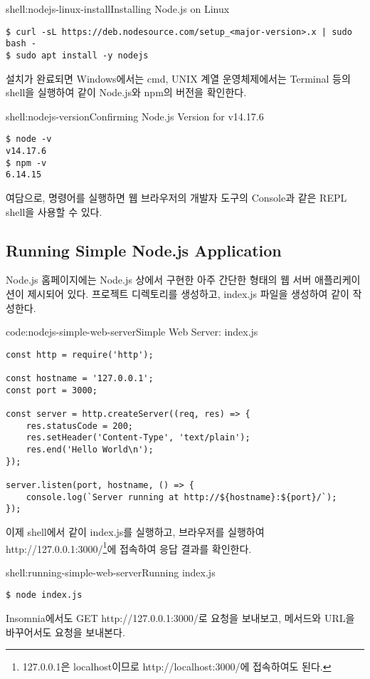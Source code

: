 \begin{shellenv}{shell:nodejs-linux-install}{Installing Node.js on Linux}\begin{verbatim}
$ curl -sL https://deb.nodesource.com/setup_<major-version>.x | sudo bash -
$ sudo apt install -y nodejs
\end{verbatim}
\end{shellenv}

설치가 완료되면 Windows에서는 cmd, UNIX 계열 운영체제에서는 Terminal 등의 shell을 실행하여 \과 같이 Node.js와 npm의 버전을 확인한다.

\begin{shellenv}{shell:nodejs-version}{Confirming Node.js Version for v14.17.6}\begin{verbatim}
$ node -v
v14.17.6
$ npm -v
6.14.15
\end{verbatim}
\end{shellenv}

여담으로,  명령어를 실행하면 웹 브라우저의 개발자 도구의 Console과 같은 REPL shell을 사용할 수 있다.

\subsection*{Running Simple Node.js Application}

Node.js 홈페이지에는 Node.js 상에서 구현한 아주 간단한 형태의 웹 서버 애플리케이션이 제시되어 있다. 프로젝트 디렉토리를 생성하고, index.js 파일을 생성하여 \와 같이 작성한다.

\begin{codeenv}{code:nodejs-simple-web-server}{Simple Web Server: index.js}\begin{verbatim}
const http = require('http');

const hostname = '127.0.0.1';
const port = 3000;

const server = http.createServer((req, res) => {
    res.statusCode = 200;
    res.setHeader('Content-Type', 'text/plain');
    res.end('Hello World\n');
});

server.listen(port, hostname, () => {
    console.log(`Server running at http://${hostname}:${port}/`);
});
\end{verbatim}
\end{codeenv}

이제 shell에서 \와 같이 index.js를 실행하고, 브라우저를 실행하여 http://127.0.0.1:3000/\footnote{127.0.0.1은 localhost이므로 http://localhost:3000/에 접속하여도 된다.}에 접속하여 응답 결과를 확인한다.

\begin{shellenv}{shell:running-simple-web-server}{Running index.js}\begin{verbatim}
$ node index.js
\end{verbatim}
\end{shellenv}

Insomnia에서도 GET http://127.0.0.1:3000/로 요청을 보내보고, 메서드와 URL을 바꾸어서도 요청을 보내본다.
